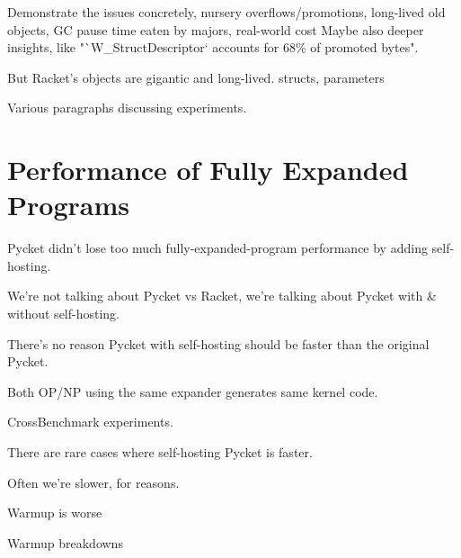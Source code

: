 		\begin{show-experiment}
				Demonstrate the issues concretely, nursery overflows/promotions, long-lived old objects, GC pause time eaten by majors, real-world cost
				Maybe also deeper insights, like "`W\_StructDescriptor` accounts for 68\% of promoted bytes".
		\end{show-experiment}

		\begin{paragraph-here}
			But Racket's objects are gigantic and long-lived.	structs, parameters
		\end{paragraph-here}

		\begin{paragraph-here}
			Various paragraphs discussing experiments.
		\end{paragraph-here}

	\section{Performance of Fully Expanded Programs}
	\label{section:cross-benchmarks}

		\begin{mainpoint}
				Pycket didn't lose too much fully-expanded-program performance by adding self-hosting.
		\end{mainpoint}

		\begin{paragraph-here}
			We're not talking about Pycket vs Racket, we're talking about Pycket with \& without self-hosting.
		\end{paragraph-here}

		\begin{paragraph-here}
			There’s no reason Pycket with self-hosting should be faster than the original Pycket.

			Both OP/NP using the same expander generates same kernel code.
		\end{paragraph-here}

		\begin{show-experiment}
			CrossBenchmark experiments.
		\end{show-experiment}

		\begin{paragraph-here}
			There are rare cases where self-hosting Pycket is faster.
		\end{paragraph-here}

		\begin{paragraph-here}
			 Often we're slower, for reasons.
		\end{paragraph-here}

		\begin{paragraph-here}
			Warmup is worse
		\end{paragraph-here}

		\begin{show-experiment}
			Warmup breakdowns
		\end{show-experiment}




